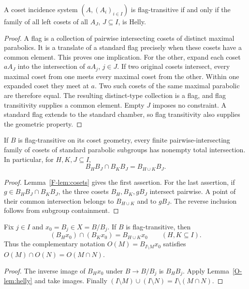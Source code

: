\begin{lemma}\label{F-lem:cosets}
A coset incidence system $(A,(A_i)_{i\in I})$ is flag-transitive if
and only if the family of all left cosets of all $A_J$, $J\subseteq I$,
is Helly.
\end{lemma}
\begin{proof}
A flag is a collection of pairwise intersecting cosets of distinct
maximal parabolics. It is a translate of a standard flag precisely
when these cosets have a common element. This proves one implication.
For the other, expand each coset $aA_J$ into the intersection of
$aA_j$, $j\in J$. If two original cosets intersect, every maximal
coset from one meets every maximal coset from the other. Within one
expanded coset they meet at $a$. Two such cosets of the same maximal
parabolic are therefore equal. The resulting distinct-type collection
is a flag, and flag transitivity supplies a common element. Empty
$J$ imposes no constraint. A standard flag extends to the standard
chamber, so flag transitivity also supplies the geometric property.
\end{proof}

\begin{lemma}\label{O-lem:helly}
If $B$ is flag-transitive on its coset geometry, every finite pairwise-intersecting family of cosets of standard parabolic subgroups has nonempty total intersection. In particular, for $H,K,J\subseteq I$,
\[
B_HB_J\cap B_KB_J=B_{H\cup K}B_J.
\]
\end{lemma}
\begin{proof}
Lemma~\ref{F-lem:cosets} gives the first assertion. For the last assertion, if $g\in B_HB_J\cap B_KB_J$, the three cosets $B_H,B_K,gB_J$ intersect pairwise. A point of their common intersection belongs to $B_{H\cup K}$ and to $gB_J$. The reverse inclusion follows from subgroup containment.
\end{proof}

\begin{theorem}\label{O-thm:elements}
Fix $j\in I$ and $x_0=B_j\in X=B/B_j$. If $B$ is flag-transitive, then
\begin{equation}\label{O-eq:orbit}
(B_Hx_0)\cap(B_Kx_0)=B_{H\cup K}x_0\qquad(H,K\subseteq I).
\end{equation}
Thus the complementary notation $O(M)=B_{I\setminus M}x_0$ satisfies $O(M)\cap O(N)=O(M\cap N)$.
\end{theorem}
\begin{proof}
The inverse image of $B_Hx_0$ under $B\to B/B_j$ is $B_HB_j$. Apply Lemma~\ref{O-lem:helly} and take images. Finally $(I\setminus M)\cup(I\setminus N)=I\setminus(M\cap N)$.
\end{proof}





